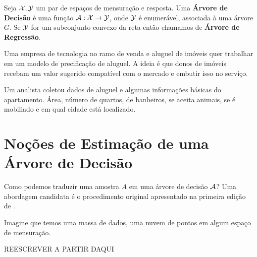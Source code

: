 \begin{defi}
Seja $\mathcal{X}, \mathcal{Y}$ um par de espaços de mensuração e resposta. Uma \textbf{Árvore de Decisão} é uma função $\mathcal{A}: \mathcal{X} \to \mathcal{Y}$, onde $\mathcal{Y}$ é enumerável, associada à uma árvore $G$. Se $\mathcal{Y}$ for um subconjunto convexo da reta então chamamos de \textbf{Árvore de Regressão}.
\end{defi}

\begin{exemplo}[Regressão]
 Uma empresa de tecnologia no ramo de venda e aluguel de imóveis quer trabalhar em um modelo de precificação de aluguel. A ideia é que donos de imóveis recebam um valor sugerido compatível com o mercado e embutir isso no serviço.
 
 Um analista coletou dados de aluguel e algumas informações básicas do apartamento. Área, número de quartos, de banheiros, se aceita animais, se é mobiliado e em qual cidade está localizado. 
 


 
 
\end{exemplo}





\section{Noções de Estimação de uma Árvore de Decisão}

Como podemos traduzir uma amostra $A$ em uma árvore de decisão $\mathcal{A}$? Uma abordagem candidata é o procedimento original apresentado na primeira edição de .

Imagine que temos uma massa de dados, uma nuvem de pontos em algum espaço de mensuração. 

REESCREVER A PARTIR DAQUI


